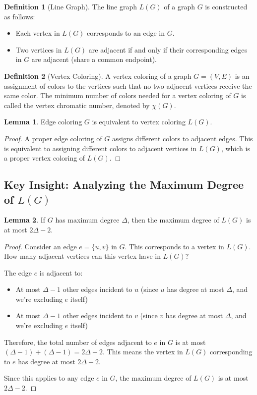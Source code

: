 \documentclass{article}
\theoremstyle{definition}
\newtheorem{lemma}{Lemma}
\newtheorem{definition}{Definition}
\begin{document}
\begin{definition}[Line Graph]
The line graph $L(G)$ of a graph $G$ is constructed as follows:
\begin{itemize}
    \item Each vertex in $L(G)$ corresponds to an edge in $G$.
    \item Two vertices in $L(G)$ are adjacent if and only if their corresponding edges in $G$ are adjacent (share a common endpoint).
\end{itemize}
\end{definition}

\begin{definition}[Vertex Coloring]
A vertex coloring of a graph $G = (V, E)$ is an assignment of colors to the vertices such that no two adjacent vertices receive the same color. The minimum number of colors needed for a vertex coloring of $G$ is called the vertex chromatic number, denoted by $\chi(G)$.
\end{definition}

\begin{lemma}
Edge coloring $G$ is equivalent to vertex coloring $L(G)$.
\end{lemma}


\begin{proof}
A proper edge coloring of $G$ assigns different colors to adjacent edges. This is equivalent to assigning different colors to adjacent vertices in $L(G)$, which is a proper vertex coloring of $L(G)$.
\end{proof}


\subsection* {Key Insight: Analyzing the Maximum Degree of $L(G)$}
\begin{lemma}
If $G$ has maximum degree $\Delta$, then the maximum degree of $L(G)$ is at most $2\Delta - 2$.
\end{lemma}

\begin{proof}
Consider an edge $e = \{u, v\}$ in $G$. This corresponds to a vertex in $L(G)$. How many adjacent vertices can this vertex have in $L(G)$?

The edge $e$ is adjacent to:
\begin{itemize}
    \item At most $\Delta - 1$ other edges incident to $u$ (since $u$ has degree at most $\Delta$, and we're excluding $e$ itself)
    \item At most $\Delta - 1$ other edges incident to $v$ (since $v$ has degree at most $\Delta$, and we're excluding $e$ itself)
\end{itemize}

Therefore, the total number of edges adjacent to $e$ in $G$ is at most $(\Delta - 1) + (\Delta - 1) = 2\Delta - 2$. This means the vertex in $L(G)$ corresponding to $e$ has degree at most $2\Delta - 2$.

Since this applies to any edge $e$ in $G$, the maximum degree of $L(G)$ is at most $2\Delta - 2$.
\end{proof}
\end{document}
